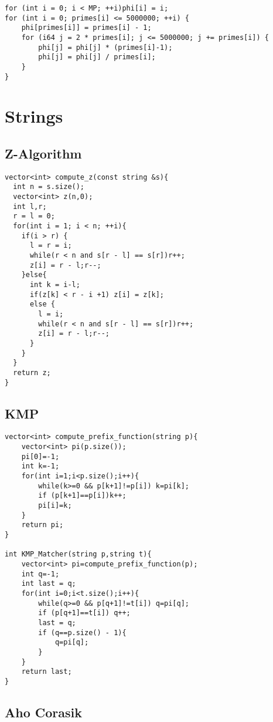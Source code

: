 \documentclass[10pt,letterpaper,twocolumn,twosided]{article}
\begin{document}
\begin{lstlisting}
for (int i = 0; i < MP; ++i)phi[i] = i;
for (int i = 0; primes[i] <= 5000000; ++i) {
    phi[primes[i]] = primes[i] - 1;
    for (i64 j = 2 * primes[i]; j <= 5000000; j += primes[i]) {
        phi[j] = phi[j] * (primes[i]-1);
        phi[j] = phi[j] / primes[i];
    }
}
\end{lstlisting}

\section{Strings}

\subsection{Z-Algorithm}

\begin{lstlisting}
vector<int> compute_z(const string &s){
  int n = s.size();
  vector<int> z(n,0);
  int l,r;
  r = l = 0;
  for(int i = 1; i < n; ++i){
    if(i > r) {
      l = r = i;
      while(r < n and s[r - l] == s[r])r++;
      z[i] = r - l;r--;
    }else{
      int k = i-l;
      if(z[k] < r - i +1) z[i] = z[k];
      else {
        l = i;
        while(r < n and s[r - l] == s[r])r++;
        z[i] = r - l;r--;
      }
    }
  }
  return z;
}
\end{lstlisting}

\subsection{KMP}

\begin{lstlisting}
vector<int> compute_prefix_function(string p){
    vector<int> pi(p.size());
    pi[0]=-1;
    int k=-1;
    for(int i=1;i<p.size();i++){
        while(k>=0 && p[k+1]!=p[i]) k=pi[k];
        if (p[k+1]==p[i])k++;
        pi[i]=k;
    }
    return pi;
}

int KMP_Matcher(string p,string t){
    vector<int> pi=compute_prefix_function(p);
    int q=-1;
    int last = q;
    for(int i=0;i<t.size();i++){
        while(q>=0 && p[q+1]!=t[i]) q=pi[q];
        if (p[q+1]==t[i]) q++;
        last = q;
        if (q==p.size() - 1){
            q=pi[q];
        }
    }
    return last;
}
\end{lstlisting}


\subsection{Aho Corasik}
\end{document}
